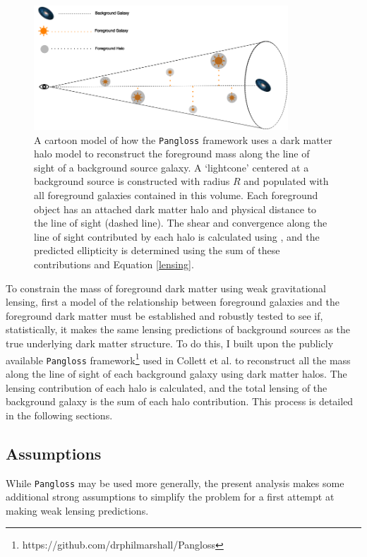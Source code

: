 \documentclass[%
 reprint,
 amsmath,amssymb,
 aps,nofootinbib
]{revtex4-1}
\begin{document}
\begin{figure}
    \centering
    \includegraphics[width=0.85\textwidth]{figs-swe/pangloss_cartoon.png}
    \captionsetup{justification=raggedright,singlelinecheck=false}
    \caption{A cartoon model of how the \texttt{Pangloss} framework uses a dark matter halo model to reconstruct the foreground mass along the line of sight of a background source galaxy. A `lightcone' centered at a background source is constructed with radius $R$ and populated with all foreground galaxies contained in this volume. Each foreground object has an attached dark matter halo and physical distance to the line of sight (dashed line). The shear and convergence along the line of sight contributed by each halo is calculated using \cite{lensing_calc}, and the predicted ellipticity is determined using the sum of these contributions and Equation \eqref{lensing}.}
    \label{pangloss_cartoon}
\end{figure}

To constrain the mass of foreground dark matter using weak gravitational
lensing, first a model of the relationship between foreground galaxies
and the foreground dark matter must be established and robustly tested
to see if, statistically, it makes the same lensing predictions of
background sources as the true underlying dark matter structure. To do
this, I built upon the publicly available \texttt{Pangloss}
framework\footnote{\label{note1}https://github.com/drphilmarshall/Pangloss}
used in Collett et al. \cite{collett_marshall} to reconstruct all the
mass along the line of sight of each background galaxy using dark matter
halos. The lensing contribution of each halo is calculated, and the
total lensing of the background galaxy is the sum of each halo
contribution. This process is detailed in the following sections.

\subsection*{Assumptions}
While \texttt{Pangloss} may be used more generally, the present analysis makes some additional strong assumptions to simplify the problem for a first attempt at making weak lensing predictions.
\end{document}
